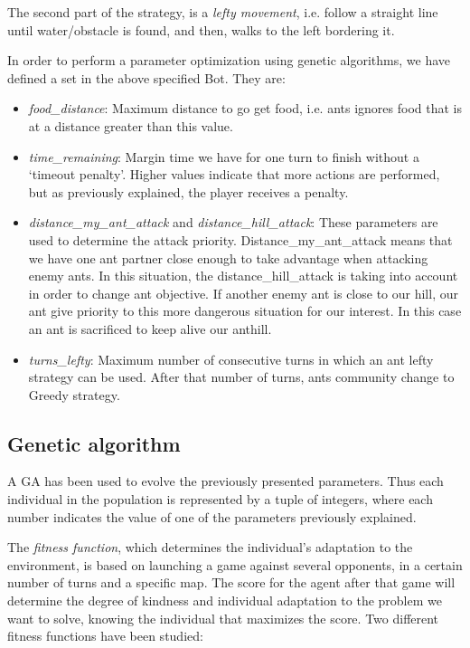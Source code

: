 \documentclass[runningheads]{llncs}
\begin{document}
The second part of the strategy, is a \textit{lefty movement}, i.e. follow a straight line until water/obstacle is found, and then, walks to the left bordering it.

 
In order to perform a parameter optimization using genetic algorithms, we have defined a set in the above specified Bot. They are:
\begin{itemize}
  \item {\em food\_distance}: Maximum distance to go get food, i.e. ants ignores food that is at a distance greater than this value.
  \item {\em time\_remaining}: Margin time we have for one turn to finish without a `timeout penalty'. Higher values indicate that more actions are performed, but as previously explained, the player receives a penalty.
  \item {\em distance\_my\_ant\_attack} and {\em distance\_hill\_attack}: These parameters are used to determine the attack priority.  Distance\_my\_ant\_attack means that we have one ant partner close enough to take advantage when attacking enemy ants. In this situation, the distance\_hill\_attack is taking into account in order to change ant objective. If another enemy ant is close to our hill, our ant give priority to this more dangerous situation for our interest. In this case an ant is sacrificed to keep alive our anthill.
  \item {\em turns\_lefty}: Maximum number of consecutive turns in which an ant lefty strategy can be used. After that number of turns, ants community change to Greedy strategy.

\end{itemize}

\subsection{Genetic algorithm}
A GA has been used to evolve the previously presented parameters. 
Thus each individual in the population is represented by a tuple of integers, where each number indicates the value of one of the parameters previously explained.

The \textit{fitness function}, which determines the individual's adaptation to the environment, is based on launching a game against several opponents, in a certain number of turns and a specific map.
The score for the agent after that game will determine the degree of kindness and individual adaptation to the problem we want to solve, knowing the individual that maximizes the score. Two different fitness functions have been studied:
\end{document}
